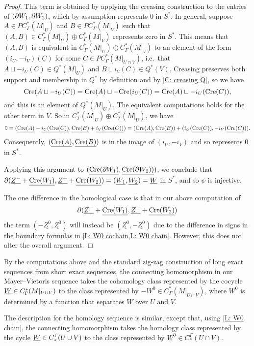 \begin{proof}
 This term is obtained by applying the creasing construction to the entries of $(\partial W_1,\partial W_2)$, which by assumption represents $0$ in $S^*$.
	In general, suppose $A \in PC^*_{\Gamma}(M|_U)$ and $B \in PC^*_\Gamma(M|_V)$ such that $(\underline{A}, \underline{B}) \in C^*_\Gamma(M|_U) \oplus C^*_\Gamma(M|_V)$ represents zero in $S^*$.
	This means that $(A,B)$ is equivalent in $C^*_\Gamma(M|_U) \oplus C^*_\Gamma(M|_V)$ to an element of the form $(i_U,-i_V)(\underline{C})$ for some $C \in PC^*_{\Gamma}(M|_{U \cap V})$, i.e.\ that $A \sqcup -i_U(C) \in Q^*(M|_U)$ and $B \sqcup i_V(C) \in Q^*(V)$.
	Creasing preserves both support and membership in $Q^*$ by definition and by \cref{C: creasing Q}, so we have
	$$\mathrm{Cre}(A \sqcup -i_U(C)) = \mathrm{Cre}(A) \sqcup -\mathrm{Cre}(i_U(C)) = \mathrm{Cre}(A) \sqcup -i_U(\mathrm{Cre}(C)),$$
	and this is an element of $Q^*(M|_U)$.
	The equivalent computations holds for the other term in $V$.
	So in $C^*_\Gamma(M|_U)\oplus C^*_\Gamma(M|_U)$, we have
 $$0= (\underline{\mathrm{Cre}(A)} -\underline{i_U(\mathrm{Cre}(C))}, \underline{\mathrm{Cre}(B)} + \underline{i_V(\mathrm{Cre}(C))}) = (\underline{\mathrm{Cre}(A)},\underline{\mathrm{Cre}(B)}) +(i_U(\underline{\mathrm{Cre}(C)}), -i_V(\underline{\mathrm{Cre}(C)})).$$
	Consequently, $(\underline{\mathrm{Cre}(A)},\underline{\mathrm{Cre}(B)})$ is in the image of $(i_U, -i_V)$ and so represents $0$ in $S^*$.

	Applying this argument to $(\underline{\mathrm{Cre}(\partial W_1)},\underline{\mathrm{Cre}(\partial W_2))})$, we conclude that
	$\partial (\underline{Z^-} + \underline{\mathrm{Cre}(W_1)},\underline{Z^+} + \underline{\mathrm{Cre}(W_2)}) = (\underline{W_1},\underline{W_2}) = \underline{W}$ in $S^*$, and so $\psi$ is injective.

	The one difference in the homological case is that in our above computation of $$\partial (\underline{Z^-} + \underline{\mathrm{Cre}(W_1)},\underline{Z^+} + \underline{\mathrm{Cre}(W_2)})$$ the term $(-\underline{Z^0},\underline{Z^0})$ will instead be $(\underline{Z^0},-\underline{Z^0})$ due to the difference in signs in the boundary formulas in \cref{L: W0 cochain,L: W0 chain}.
	However, this does not alter the overall argument.
\end{proof}

\begin{remark}\label{R: MV boundary}
	By the computations above and the standard zig-zag construction of long exact sequences from short exact sequences, the connecting homomorphism in our Mayer--Vietoris sequence takes the cohomology class represented by the cocycle $\underline{W} \in C^*_\Gamma(M|_{U \cup V})$ to the class represented by $-\underline{W^0} \in C^*_\Gamma(M|_{U \cap V})$, where $W^0$ is determined by a function that separates $W$ over $U$ and $V$.

	The description for the homology sequence is similar, except that, using \cref{L: W0 chain}, the connecting homomorphism takes the homology class represented by the cycle $\underline{W} \in C_*^\Gamma(U \cup V)$ to the class represented by $\underline{W^0} \in C_*^\Gamma(U \cap V)$.
\end{remark}

